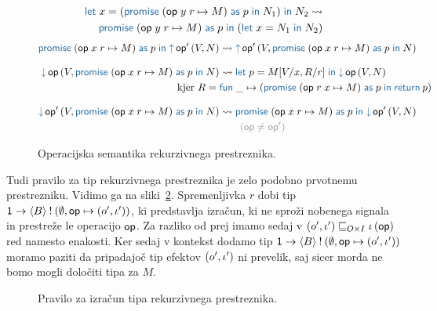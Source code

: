 \begin{figure}[H]
	\centering
	\small~
	\begin{align*}
		\tmlet{x}{(\tmwithrec{op}{y}{r}{M}{p}{N_1})}{N_2} \reduces \\
		\tmwithrec{op}{y}{r}{M}{p}{(\tmlet{x}{N_1}{N_2})}
	\end{align*}
	\vspace{-5ex}
	\begin{align*}
		\tmwithrec{op}{x}{r}{M}{p}{\tmopout{op'}{V}{N}} &\reduces \tmopout{op'}{V}{\tmwithrec{op}{x}{r}{M}{p}{N}}
		\razmik
		\tmopin{op}{V}{\tmwithrec{op}{x}{r}{M}{p}{N}} &\reduces \tmlet{p}{M[V/x, R/r]}{\tmopin{op}{V}{N}} \\
		\text{kjer }R = \;& \tmfunano{\_}{(\tmwithrec{op}{r}{x}{M}{p}{\tmreturn{p}})}
		\razmik
		\tmopin{op'}{V}{\tmwithrec{op}{x}{r}{M}{p}{N}} &\reduces \tmwithrec{op}{x}{r}{M}{p}{\tmopin{op'}{V}{N}} \\
		&\qquad {\color{rulenameColor}(\op \neq \op')}
	\end{align*}
	
	\caption{Operacijska semantika rekurzivnega prestreznika.}
	\label{fig:semantika-prestreznik}
\end{figure}

Tudi pravilo za tip rekurzivnega prestreznika je zelo podobno prvotnemu prestrezniku. Vidimo ga na sliki~\ref{fig:tipi-pravila-rekurzivni-prestreznik}. Spremenljivka $r$ dobi tip $\tyfun{\tyunit}{\tycomp{\typromise{B}}{\emptyset, \op \mapsto (\o', \i')}}$, ki predstavlja izračun, ki ne sproži nobenega signala in prestreže le operacijo $\op$.
Za razliko od prej imamo sedaj v $({\o'} , {\i'}) \order{O \times I} \i\, (\op)$ red namesto enakosti. Ker sedaj v kontekst dodamo tip $\tyfun{\tyunit}{\tycomp{\typromise{B}}{\emptyset, \op \mapsto (\o', \i')}}$ moramo paziti da pripadajoč tip efektov $(\o', \i')$ ni prevelik, saj sicer morda ne bomo mogli določiti tipa za $M$.

\begin{figure}[H]
	\centering
	\small
	\begin{mathpar}
	\end{mathpar}
	
	\caption{Pravilo za izračun tipa rekurzivnega prestreznika.}
	\label{fig:tipi-pravila-rekurzivni-prestreznik}
\end{figure} 



